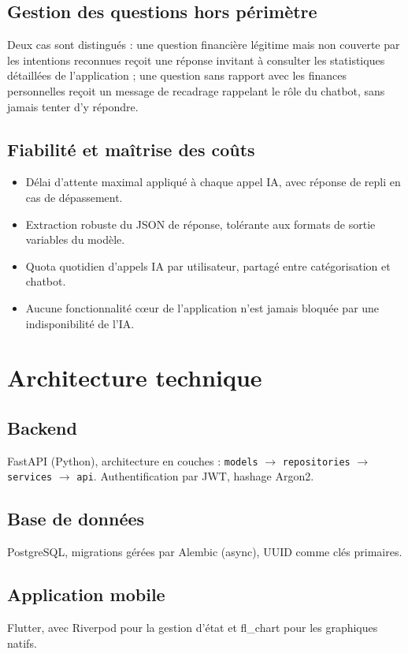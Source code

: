 \documentclass[11pt,a4paper]{article}
\begin{document}
\subsection{Gestion des questions hors périmètre}
Deux cas sont distingués : une question financière légitime mais non couverte par les intentions reconnues reçoit une réponse invitant à consulter les statistiques détaillées de l'application ; une question sans rapport avec les finances personnelles reçoit un message de recadrage rappelant le rôle du chatbot, sans jamais tenter d'y répondre.

\subsection{Fiabilité et maîtrise des coûts}
\begin{itemize}[leftmargin=*]
    \item Délai d'attente maximal appliqué à chaque appel IA, avec réponse de repli en cas de dépassement.
    \item Extraction robuste du JSON de réponse, tolérante aux formats de sortie variables du modèle.
    \item Quota quotidien d'appels IA par utilisateur, partagé entre catégorisation et chatbot.
    \item Aucune fonctionnalité cœur de l'application n'est jamais bloquée par une indisponibilité de l'IA.
\end{itemize}

\section{Architecture technique}

\subsection{Backend}
FastAPI (Python), architecture en couches : \texttt{models} $\rightarrow$ \texttt{repositories} $\rightarrow$ \texttt{services} $\rightarrow$ \texttt{api}. Authentification par JWT, hashage Argon2.

\subsection{Base de données}
PostgreSQL, migrations gérées par Alembic (async), UUID comme clés primaires.

\subsection{Application mobile}
Flutter, avec Riverpod pour la gestion d'état et fl\_chart pour les graphiques natifs.
\end{document}
